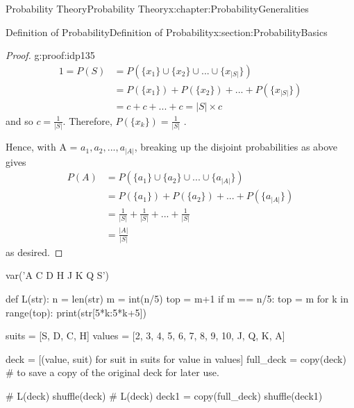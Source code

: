 \documentclass[oneside,10pt,]{book}
\numberwithin{equation}{section}
\begin{document}
\begin{chapterptx}{Probability Theory}{}{Probability Theory}{}{}{x:chapter:ProbabilityGeneralities}
\begin{sectionptx}{Definition of Probability}{}{Definition of Probability}{}{}{x:section:ProbabilityBasics}
\begin{proof}{}{g:proof:idp135}
\begin{align*}
1 = P(S) & = P( \{ x_1 \} \cup \{x_2 \} \cup ... \cup \{x_{|S|} \} )\\
& = P(\{ x_1 \}) + P(\{ x_2 \} ) + ... + P(\{ x_{|S|} \} )\\
& = c + c + ... + c = {|S|} \times c
\end{align*}
and so \(c = \frac{1}{{|S|}}\). Therefore, \(P( \{ x_k \} ) = \frac{1}{|S|}\) .%
\par
Hence, with A = \textbraceleft{}\(a_1, a_2, ..., a_{|A|}\)\textbraceright{}, breaking up the disjoint probabilities as above gives%
\begin{align*}
P(A) & = P( \{ a_1 \} \cup \{ a_2 \} \cup ... \cup \{ a_{|A|} \} )\\
& = P(\{ a_1 \}) + P(\{ a_2 \} ) + ... + P(\{ a_{|A|} \} )\\
& = \frac{1}{{|S|}} + \frac{1}{{|S|}} + ... + \frac{1}{{|S|}}\\
& = \frac{|A|}{{|S|}}
\end{align*}
as desired.%
\end{proof}
\begin{sageinput}
var('A C D H J K Q S') 

def L(str):
    n = len(str)
    m = int(n/5)
    top = m+1
    if m == n/5:
        top = m
    for k in range(top):
        print(str[5*k:5*k+5])
        
suits = [S, D, C, H] 
values = [2, 3, 4, 5, 6, 7, 8, 9, 10, J, Q, K, A] 

deck = [(value, suit) for suit in suits for value in values]
full_deck = copy(deck)  # to save a copy of the original deck for later use.

# L(deck)
shuffle(deck)
# L(deck)
deck1 = copy(full_deck)
shuffle(deck1)


\end{sageinput}
\end{sectionptx}
\end{chapterptx}
\end{document}
